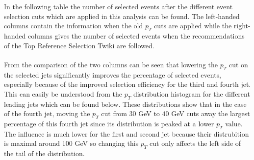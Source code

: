 In the following table the number of selected events after the different event selection cuts which are applied in this analysis can be found. The left-handed columns contain the information when the old $p_T$ cuts are applied while the right-handed columns gives the number of selected events when the recommendations of the Top Reference Selection Twiki are followed.\\
\\
From the comparison of the two columns can be seen that lowering the $p_T$ cut on the selected jets significantly improves the percentage of selected events, especially because of the improved selection efficiency for the third and fourth jet. This can easily be understood from the $p_T$ distribution histogram for the different leading jets which can be found below.
These distributions show that in the case of the fourth jet, moving the $p_T$ cut from $30$ GeV to $40$ GeV cuts away the largest percentage of this fourth jet since its distribution is peaked at a lower $p_T$ value. The influence is much lower for the first and second jet because their distrubition is maximal around $100$ GeV so changing this $p_T$ cut only affects the left side of the tail of the distribution.\\
